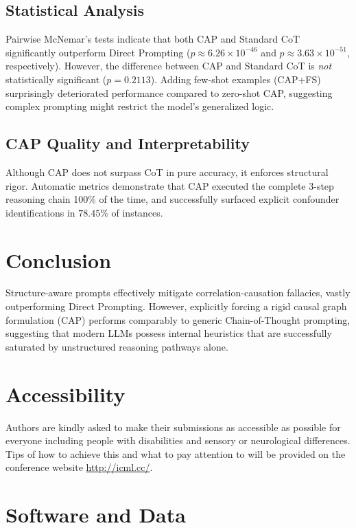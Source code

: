 \documentclass{article}
\theoremstyle{plain}
\theoremstyle{definition}
\theoremstyle{remark}
\begin{document}
\subsection{Statistical Analysis}

Pairwise McNemar's tests indicate that both CAP and Standard CoT significantly outperform Direct Prompting ($p \approx 6.26 \times 10^{-46}$ and $p \approx 3.63 \times 10^{-51}$, respectively). However, the difference between CAP and Standard CoT is \textit{not} statistically significant ($p=0.2113$). Adding few-shot examples (CAP+FS) surprisingly deteriorated performance compared to zero-shot CAP, suggesting complex prompting might restrict the model's generalized logic.

\subsection{CAP Quality and Interpretability}

Although CAP does not surpass CoT in pure accuracy, it enforces structural rigor. Automatic metrics demonstrate that CAP executed the complete 3-step reasoning chain 100\% of the time, and successfully surfaced explicit confounder identifications in $78.45\%$ of instances.

\section{Conclusion}

Structure-aware prompts effectively mitigate correlation-causation fallacies, vastly outperforming Direct Prompting. However, explicitly forcing a rigid causal graph formulation (CAP) performs comparably to generic Chain-of-Thought prompting, suggesting that modern LLMs possess internal heuristics that are successfully saturated by unstructured reasoning pathways alone.

\section*{Accessibility}

Authors are kindly asked to make their submissions as accessible as possible
for everyone including people with disabilities and sensory or neurological
differences. Tips of how to achieve this and what to pay attention to will be
provided on the conference website \url{http://icml.cc/}.

\section*{Software and Data}
\end{document}
